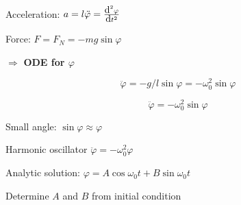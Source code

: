 \begin{frame}[fragile]
\begin{columns}[T]
\begin{column}{0.65\textwidth}
{ \vspace{2ex}

 Acceleration:  $a = l \ddot{\varphi} = \frac{\mbox{d}^2 \varphi}{\mbox{d} t^2} $

 \vspace{2ex}

 Force: $F=F_N = - m g \sin \varphi$

 \vspace{4ex}

 $\Longrightarrow$ {\bf ODE for $\varphi$}

 $$\ddot{\varphi} = - g / l \sin \varphi = -\omega_0^2 \sin \varphi$$
 }

 {

 $$\ddot{\varphi} = - \omega_0^2 \sin \varphi $$

 Small angle: $\sin \varphi \approx \varphi$

 \vspace{2ex}

 Harmonic oscillator $\ddot{\varphi} = - \omega_0^2 \varphi$

 \vspace{2ex}

 Analytic solution: $\varphi = A \cos \omega_0 t + B \sin \omega_0 t$

 \vspace{2ex}

 Determine $A$ and $B$ from initial condition

 }

\end{column}
\end{columns}
\end{frame}
